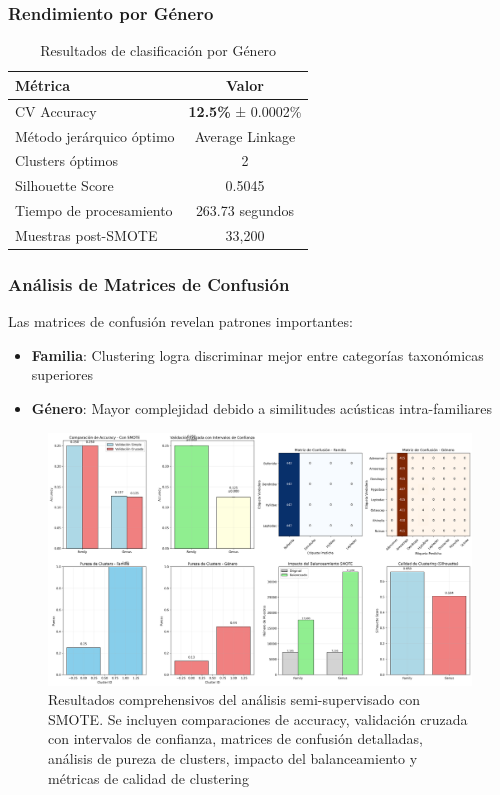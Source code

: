 \documentclass[12pt,a4paper]{article}
\begin{document}
\subsubsection{Rendimiento por Género}
\begin{table}[H]
\centering
\begin{tabular}{|l|c|}
\hline
\textbf{Métrica} & \textbf{Valor} \\
\hline
CV Accuracy & \textbf{12.5\%} ± 0.0002\% \\
Método jerárquico óptimo & Average Linkage \\
Clusters óptimos & 2 \\
Silhouette Score & 0.5045 \\
Tiempo de procesamiento & 263.73 segundos \\
Muestras post-SMOTE & 33,200 \\
\hline
\end{tabular}
\caption{Resultados de clasificación por Género}
\end{table}

\subsubsection{Análisis de Matrices de Confusión}
Las matrices de confusión revelan patrones importantes:
\begin{itemize}
    \item \textbf{Familia}: Clustering logra discriminar mejor entre categorías taxonómicas superiores
    \item \textbf{Género}: Mayor complejidad debido a similitudes acústicas intra-familiares
\end{itemize}

\begin{figure}[H]
    \centering
    \includegraphics[width=\textwidth]{figures/figura_05_resultados_semi_supervisado_smote.png}
    \caption{Resultados comprehensivos del análisis semi-supervisado con SMOTE. Se incluyen comparaciones de accuracy, validación cruzada con intervalos de confianza, matrices de confusión detalladas, análisis de pureza de clusters, impacto del balanceamiento y métricas de calidad de clustering}
    \label{fig:resultados_finales}
\end{figure}
\end{document}
